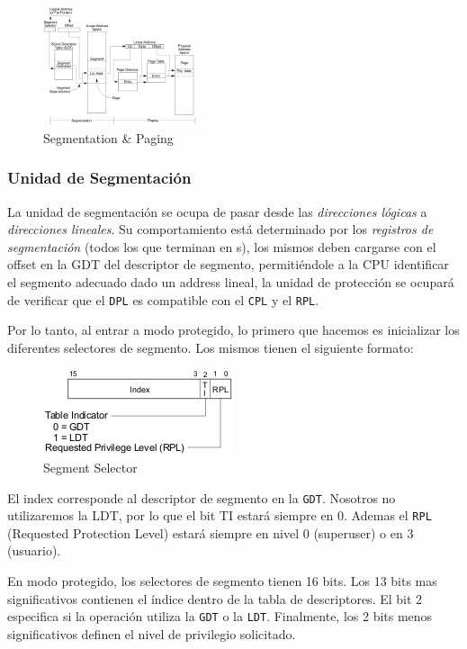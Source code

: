 \begin{figure}[H]
  \centering
    \includegraphics[width=0.4\textwidth]{images/memory_management}
  \caption{Segmentation \& Paging}
\end{figure}

\subsubsection{Unidad de Segmentación}

La unidad de segmentación se ocupa de pasar desde las \textit{direcciones lógicas} a \textit{direcciones lineales}. Su comportamiento está determinado por los \textit{registros de segmentación} (todos los que terminan en s), los mismos deben cargarse con el offset en la GDT del descriptor de segmento, permitiéndole a la CPU identificar el segmento adecuado dado un address lineal, la unidad de protección se ocupará de verificar que el \texttt{DPL} es compatible con el \texttt{CPL} y el \texttt{RPL}.

Por lo tanto, al entrar a modo protegido, lo primero que hacemos es inicializar los diferentes selectores de segmento. Los mismos tienen el siguiente formato:

\begin{figure}[h!]
  \centering
    \includegraphics[scale=0.8]{images/segment_selector}
  \caption{Segment Selector}
\end{figure}

El index corresponde al descriptor de segmento en la \texttt{GDT}. Nosotros no utilizaremos la LDT, por lo que el bit TI estará siempre en 0. Ademas el \texttt{RPL} (Requested Protection Level) estará siempre en nivel 0 (superuser) o en 3 (usuario).

En modo protegido, los selectores de segmento tienen 16 bits. Los 13 bits mas significativos contienen el índice dentro de la tabla de descriptores. El bit 2 especifica si la operación utiliza la \texttt{GDT} o la \texttt{LDT}. Finalmente, los 2 bits menos significativos definen el nivel de privilegio solicitado.

